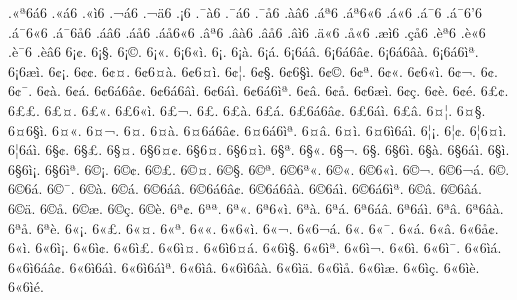 {.^^ab^^aa6^^e16 .^^ab^^e16 .^^ab^^ec6 .^^ac^^e16 .^^ac^^e46 .^^ad^^a16 .^^af^^e06 .^^af^^e16 
.^^af^^e56 .^^e0^^e26 .^^e1^^aa6 .^^e1^^aa6^^ab6 .^^e1^^ab6 .^^e1^^af6 .^^e1^^af6'6 .^^e1^^af6^^ab6 
.^^e1^^af6^^e56 .^^e1^^e26 .^^e1^^e56 .^^e1^^e56^^ab6 .^^e2^^aa6 .^^e2^^e06 .^^e2^^e56 .^^e2^^ec6 
.^^e4^^ab6 .^^e5^^ab6 .^^e6^^ec6 .^^e7^^e56 .^^e8^^aa6 .^^e8^^ab6 .^^e8^^af6 .^^e8^^e26 
6^^a1^^a2. 6^^a1^^a7. 6^^a1^^a9. 6^^a1^^ab. 6^^a16^^ab^^ec. 6^^a1^^ad. 6^^a1^^e0. 6^^a1^^e1. 
6^^a16^^e1^^e2. 6^^a16^^e16^^e2^^a2. 6^^a16^^e16^^e2^^e0. 6^^a16^^e16^^ec^^aa. 6^^a16^^e6^^ec. 6^^a2^^a1. 6^^a2^^a2. 6^^a2^^a4. 
6^^a26^^a4^^e0. 6^^a26^^a4^^ec. 6^^a2^^a6. 6^^a2^^a7. 6^^a26^^a7^^ec. 6^^a2^^a9. 6^^a2^^aa. 6^^a2^^ab. 
6^^a26^^ab^^ec. 6^^a2^^ac. 6^^a2^^ad. 6^^a2^^af. 6^^a2^^e0. 6^^a2^^e1. 6^^a26^^e16^^e2^^a2. 6^^a26^^e16^^e2^^ec. 
6^^a26^^e1^^ec. 6^^a26^^e16^^ec^^aa. 6^^a2^^e2. 6^^a2^^e5. 6^^a26^^e6^^ec. 6^^a2^^e7. 6^^a2^^e8. 6^^a2^^e9. 
6^^a3^^a2. 6^^a3^^a3. 6^^a3^^a4. 6^^a3^^ab. 6^^a36^^ab^^ec. 6^^a3^^ac. 6^^a3^^ad. 6^^a3^^e0. 
6^^a3^^e1. 6^^a36^^e16^^e2^^a2. 6^^a36^^e1^^ec. 6^^a3^^e2. 6^^a4^^a6. 6^^a4^^a7. 6^^a46^^a7^^ec. 6^^a4^^ab. 
6^^a4^^ac. 6^^a4^^ad. 6^^a4^^e0. 6^^a46^^e16^^e2^^a2. 6^^a46^^e16^^ec^^aa. 6^^a4^^e2. 6^^a4^^ec. 6^^a46^^ec6^^e1^^ec. 
6^^a6^^a1. 6^^a6^^a2. 6^^a66^^a4^^ec. 6^^a66^^e1^^ec. 6^^a7^^a2. 6^^a7^^a3. 6^^a7^^a4. 6^^a76^^a4^^a2. 
6^^a76^^a4^^ad. 6^^a76^^a4^^ec. 6^^a7^^aa. 6^^a7^^ab. 6^^a7^^ac. 6^^a7^^ad. 6^^a76^^ad^^ec. 6^^a7^^e0. 
6^^a76^^e1^^ec. 6^^a7^^ec. 6^^a76^^ec^^a1. 6^^a76^^ec^^aa. 6^^a9^^a1. 6^^a9^^a2. 6^^a9^^a3. 6^^a9^^a4. 
6^^a9^^a7. 6^^a9^^aa. 6^^a96^^aa^^ab. 6^^a9^^ab. 6^^a96^^ab^^ec. 6^^a9^^ac. 6^^a96^^ac^^e1. 6^^a9^^ad. 
6^^a96^^ad^^e1. 6^^a9^^af. 6^^a9^^e0. 6^^a9^^e1. 6^^a96^^e1^^e2. 6^^a96^^e16^^e2^^a2. 6^^a96^^e16^^e2^^e0. 6^^a96^^e1^^ec. 
6^^a96^^e16^^ec^^aa. 6^^a9^^e2. 6^^a96^^e2^^e1. 6^^a9^^e4. 6^^a9^^e5. 6^^a9^^e6. 6^^a9^^e7. 6^^a9^^e8. 
6^^aa^^a2. 6^^aa^^aa. 6^^aa^^ab. 6^^aa6^^ab^^ec. 6^^aa^^e0. 6^^aa^^e1. 6^^aa6^^e1^^e2. 6^^aa6^^e1^^ec. 
6^^aa^^e2. 6^^aa6^^e2^^e0. 6^^aa^^e5. 6^^aa^^e8. 6^^ab^^a1. 6^^ab^^a3. 6^^ab^^a4. 6^^ab^^aa. 
6^^ab^^ab. 6^^ab6^^ab^^ec. 6^^ab^^ac. 6^^ab6^^ac^^e1. 6^^ab^^ad. 6^^ab^^af. 6^^ab^^e1. 6^^ab^^e2. 
6^^ab6^^e5^^a2. 6^^ab^^ec. 6^^ab6^^ec^^a1. 6^^ab6^^ec^^a2. 6^^ab6^^ec^^a3. 6^^ab6^^ec^^a4. 6^^ab6^^ec6^^a4^^e1. 6^^ab6^^ec^^a7. 
6^^ab6^^ec^^aa. 6^^ab6^^ec^^ac. 6^^ab6^^ec^^ad. 6^^ab6^^ec^^af. 6^^ab6^^ec^^e1. 6^^ab6^^ec6^^e1^^e2^^a2. 6^^ab6^^ec6^^e1^^ec. 6^^ab6^^ec6^^e1^^ec^^aa. 
6^^ab6^^ec^^e2. 6^^ab6^^ec6^^e2^^e0. 6^^ab6^^ec^^e4. 6^^ab6^^ec^^e5. 6^^ab6^^ec^^e6. 6^^ab6^^ec^^e7. 6^^ab6^^ec^^e8. 6^^ab6^^ec^^e9. 
}
